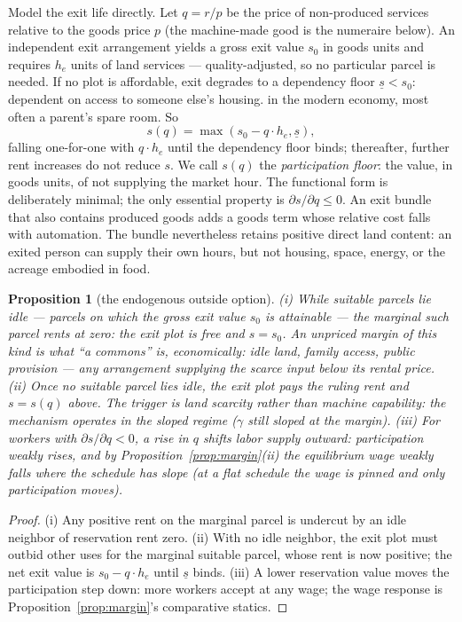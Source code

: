 \documentclass[12pt]{article}
\theoremstyle{plain}
\newtheorem{proposition}{Proposition}
\begin{document}
Model the exit life directly. Let $q = r/p$ be the price of non-produced services relative to the goods price $p$ (the machine-made good is the numeraire below). An independent exit arrangement yields a gross exit value $s_0$ in goods units and requires $h_e$ units of land services --- quality-adjusted, so no particular parcel is needed. If no plot is affordable, exit degrades to a dependency floor $\underline{s} < s_0$: dependent on access to someone else's housing. in the modern economy, most often a parent's spare room. So
\begin{equation}\label{eq:exit}
s(q) = \max( s_0 - q\cdot h_e , \underline{s} ),
\end{equation}
falling one-for-one with $q\cdot h_e$ until the dependency floor binds; thereafter, further rent increases do not reduce $s$. We call $s(q)$ the \emph{participation floor}: the value, in goods units, of not supplying the market hour. The functional form is deliberately minimal; the only essential property is $\partial s/\partial q \le 0$. An exit bundle that also contains produced goods adds a goods term whose relative cost falls with automation. The bundle nevertheless retains positive direct land content: an exited person can supply their own hours, but not housing, space, energy, or the acreage embodied in food.

\begin{proposition}[the endogenous outside option]\label{prop:exit}
(i) While suitable parcels lie idle --- parcels on which the gross exit value $s_0$ is attainable --- the marginal such parcel rents at zero: the exit plot is free and $s = s_0$. An unpriced margin of this kind is what ``a commons'' is, economically: idle land, family access, public provision --- any arrangement supplying the scarce input below its rental price. (ii) Once no suitable parcel lies idle, the exit plot pays the ruling rent and $s = s(q)$ above. The trigger is land scarcity rather than machine capability: the mechanism operates in the sloped regime ($\gamma$ still sloped at the margin). (iii) For workers with $\partial s/\partial q < 0$, a rise in $q$ shifts labor supply outward: participation weakly rises, and by Proposition~\ref{prop:margin}(ii) the equilibrium wage weakly falls where the schedule has slope (at a flat schedule the wage is pinned and only participation moves).
\end{proposition}

\begin{proof}
(i) Any positive rent on the marginal parcel is undercut by an idle neighbor of reservation rent zero. (ii) With no idle neighbor, the exit plot must outbid other uses for the marginal suitable parcel, whose rent is now positive; the net exit value is $s_0 - q\cdot h_e$ until $\underline{s}$ binds. (iii) A lower reservation value moves the participation step down: more workers accept at any wage; the wage response is Proposition~\ref{prop:margin}'s comparative statics.
\end{proof}
\end{document}
